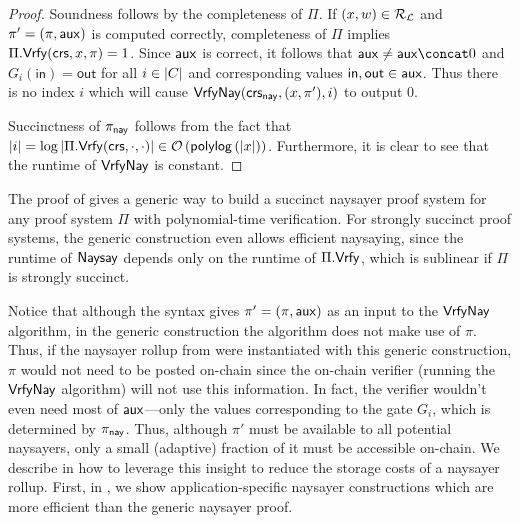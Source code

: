 \begin{proof}
Soundness follows by the completeness of $\Pi$. If $(x,w) \in \mathcal{R}_{\mathcal{L}}$ and $\pi' = (\pi, \mathsf{aux})$ is computed correctly, completeness of $\Pi$ implies $\Pi.\mathsf{Vrfy}(\mathsf{crs}, x, \pi) = 1$. Since $\mathsf{aux}$ is correct, it follows that $\aux \neq \aux \concat 0$ and $G_i(\mathsf{in}) = \mathsf{out}$ for all $i \in \lvert C \rvert$ and corresponding values $\mathsf{in},\mathsf{out} \in \mathsf{aux}$. Thus there is no index $i$ which will cause ${\mathsf{Vrfy}}\mathsf{Nay}(\mathsf{crs}_{\mathsf{nay}}, (x, \pi'), i)$ to output 0.

Succinctness of $\pi_{\mathsf{nay}}$ follows from the fact that $\lvert i \rvert = \log{\lvert \Pi.\ensuremath{\mathsf{Vrfy}}(\ensuremath{\mathsf{crs}}, \cdot, \cdot) \rvert} \in 
\mathcal{O}\left(\mathsf{polylog}\left(\lvert x \rvert\right)\right)$. Furthermore, it is clear to see that the runtime of ${\mathsf{Vrfy}}\mathsf{Nay}$ is constant.
\end{proof}

The proof of  gives a generic way to build a succinct naysayer proof system for any proof system $\Pi$ with polynomial-time verification. For strongly succinct proof systems, the generic construction even allows efficient naysaying, since the runtime of $\mathsf{Naysay}$ depends only on the runtime of $\Pi.\mathsf{Vrfy}$, which is sublinear if $\Pi$ is strongly succinct.

Notice that although the syntax gives $\pi' = (\pi, \mathsf{aux})$ as an input to the ${\mathsf{Vrfy}}\mathsf{Nay}$ algorithm, in the generic construction the algorithm does not make use of $\pi$. Thus, if the naysayer rollup from  were instantiated with this generic construction, $\pi$ would not need to be posted on-chain since the on-chain verifier (running the ${\mathsf{Vrfy}}\mathsf{Nay}$ algorithm) will not use this information. In fact, the verifier wouldn't even need most of $\mathsf{aux}$---only the values corresponding to the gate $G_i$, which is determined by $\pi_{\mathsf{nay}}$. Thus, although $\pi'$ must be available to all potential naysayers, only a small (adaptive) fraction of it must be accessible on-chain. We describe in  how to leverage this insight to reduce the storage costs of a naysayer rollup. First, in , we show application-specific naysayer constructions which are more efficient than the generic naysayer proof.

